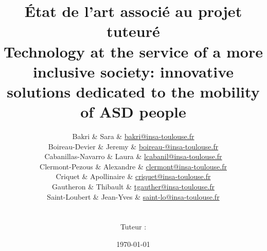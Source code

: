\newcommand{\addentry}[3]{\small{#1} & \small{#2} & \small{\href{mailto:#3}{#3}}\\}


\newcommand{\projecttitle}{
    Technology at the service of a more inclusive society: innovative solutions dedicated to the mobility of ASD people
}

\newcommand{\students}{
    \addentry{Bakri}{Sara}{bakri@insa-toulouse.fr}
    \addentry{Boireau-Devier}{Jeremy}{boireau-@insa-toulouse.fr}
    \addentry{Cabanillas-Navarro}{Laura}{lcabanil@insa-toulouse.fr}
    \addentry{Clermont-Pezous}{Alexandre}{clermont@insa-toulouse.fr}
    \addentry{Criquet}{Apollinaire}{criquet@insa-toulouse.fr}
    \addentry{Gautheron}{Thibault}{tgauther@insa-toulouse.fr}
    \addentry{Saint-Loubert}{Jean-Yves}{saint-lo@insa-toulouse.fr}
}

\newcommand{\tutors}{
    \addentry{Guermouche}{Nawal}{nawal.guermouche@laas.fr}
}

\title{État de l’art associé au projet tuteuré \\ \vspace{0.5cm} \LARGE{\textbf{\projecttitle}} \vspace{0.75cm}}
\author{\students \\ \vspace{1cm} \\ Tuteur : \tutor}
\date{\today}
